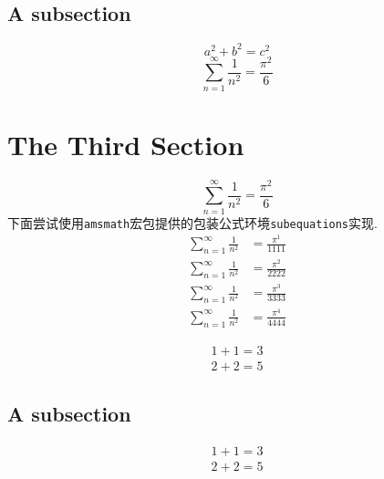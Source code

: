\documentclass[12pt]{ctexart}
\begin{document}
    \subsection{A subsection}
    \begin{subequations}
          \begin{equation}
              a^2+b^2=c^2
              \label{eq:abc}
          \end{equation}
    \end{subequations}
    \lipsum[3]
        \begin{equation}
            \sum_{n=1}^{\infty} \frac{1}{n^2} = \frac{\pi^2}{6}
        \end{equation}
    \section{The Third Section}
    \begin{equation}
        \sum_{n=1}^{\infty} \frac{1}{n^2} = \frac{\pi^2}{6}
    \end{equation}
    下面尝试使用\verb|amsmath|宏包提供的包装公式环境\verb|subequations|实现.
    \begin{subequations}
        \begin{align}
        \sum_{n=1}^{\infty} \frac{1}{n^2} &= \frac{\pi^1}{1111} \\
        \sum_{n=1}^{\infty} \frac{1}{n^2} &= \frac{\pi^2}{2222} \\
        \sum_{n=1}^{\infty} \frac{1}{n^2} &= \frac{\pi^3}{3333} \\
        \sum_{n=1}^{\infty} \frac{1}{n^2} &= \frac{\pi^4}{4444}
        \end{align}
        \label{eq:mult-lines}
    \end{subequations}

    \begin{subequations}
      \begin{align}
        1 + 1 = 3 \\
        2 + 2 = 5
      \end{align}
    \end{subequations}

    \subsection{A subsection}
    \begin{subequations}
      \begin{align}
        1 + 1 = 3 \\
        2 + 2 = 5
      \end{align}
    \end{subequations}
\end{document}
